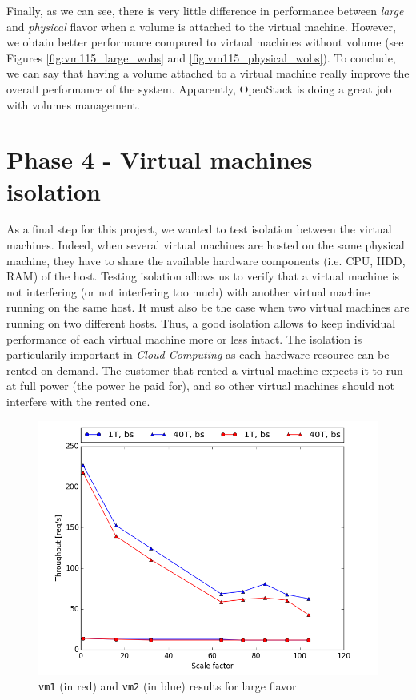 Finally, as we can see, there is very little difference in performance between \textit{large} and \textit{physical} flavor when a volume is attached to the virtual machine. 
However, we obtain better performance compared to virtual machines without volume (see Figures \ref{fig:vm115_large_wobs} and \ref{fig:vm115_physical_wobs}). 
To conclude, we can say that having a volume attached to a virtual machine really improve the overall performance of the system.
Apparently, OpenStack is doing a great job with volumes management.




\section{Phase 4 - Virtual machines isolation}

As a final step for this project, we wanted to test isolation between the virtual machines.
Indeed, when several virtual machines are hosted on the same physical machine, they have to share the available hardware components (i.e. CPU, HDD, RAM) of the host.
Testing isolation allows us to verify that a virtual machine is not interfering (or not interfering too much) with another virtual machine running on the same host. 
It must also be the case when two virtual machines are running on two different hosts. 
Thus, a good isolation allows to keep individual performance of each virtual machine more or less intact.
The isolation is particularily important in \textit{Cloud Computing} as each hardware resource can be rented on demand. 
The customer that rented a virtual machine expects it to run at full power (the power he paid for), and so other virtual machines should not interfere with the rented one.

\begin{figure}[h]
	\centering
	\includegraphics[scale=0.5]{figures/results/vm_large_iso.png}
	\caption{\texttt{vm1} (in red) and \texttt{vm2} (in blue) results for large flavor}
	\label{fig:vm_large_iso}
\end{figure}

